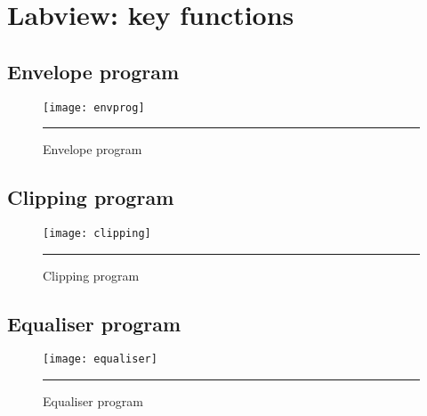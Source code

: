 
\chapter{Labview: key functions} %
\label{AppendixE} %

\section{Envelope program}

\begin{figure}[htbp]
\centering
\texttt{[image: envprog]}
\rule{30em}{0.5pt}
\caption{Envelope program}
\end{figure}
\newpage
\section{Clipping program}

\begin{figure}[!h]
\centering
\texttt{[image: clipping]}
\rule{30em}{0.5pt}
\caption{Clipping program}
\end{figure}

\section{Equaliser program}

\begin{figure}[!htbp]
\centering
\texttt{[image: equaliser]}
\rule{30em}{0.5pt}
\caption{Equaliser program}
\end{figure}
